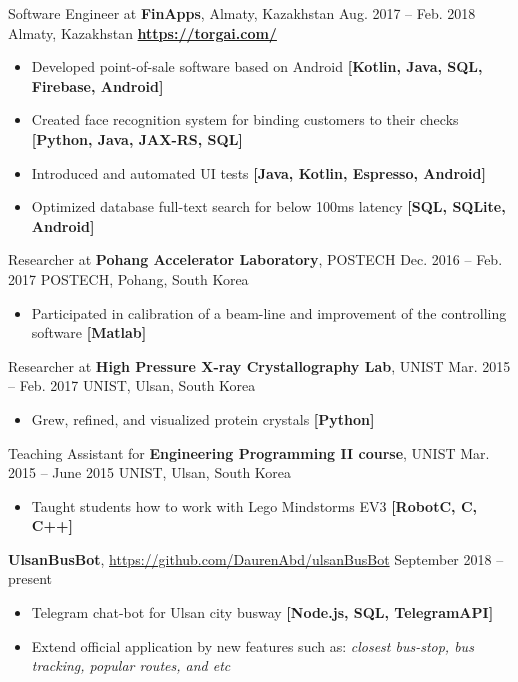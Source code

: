 \documentclass[10pt,a4paper]{altacv}
\begin{document}
\medskip

\cveventflat
    {Software Engineer at }
    {\textbf{FinApps}, Almaty, Kazakhstan}
    {Aug. 2017 -- Feb. 2018}
    {Almaty, Kazakhstan}
\smallskip
\newline
\href{https://torgai.com/}{\textbf{https://torgai.com/}}
\begin{itemize}
\item Developed point-of-sale software based on Android
    \textbf{[Kotlin, Java, SQL, Firebase, Android]}
\item Created face recognition system for binding customers to their checks 
    \textbf{[Python, Java, JAX-RS, SQL]}
\item Introduced and automated UI tests 
    \textbf{[Java, Kotlin, Espresso, Android]}
\item Optimized database full-text search for below 100ms latency 
    \textbf{[SQL, SQLite, Android]}
\end{itemize}

\medskip

\cveventflat
    {Researcher at}
    {\textbf{Pohang Accelerator Laboratory}, POSTECH}
    {Dec. 2016 -- Feb. 2017}
    {POSTECH, Pohang, South Korea}
\medskip
\begin{itemize}
\item Participated in calibration of a beam-line and improvement of the controlling software 
    \textbf{[Matlab]}
\end{itemize}
\medskip
\cveventflat
    {Researcher at}
    {\textbf{High Pressure X-ray Crystallography Lab}, UNIST}
    {Mar. 2015 --  Feb. 2017}
    {UNIST, Ulsan, South Korea}
\medskip
\begin{itemize}
\item Grew, refined, and visualized protein crystals
    \textbf{[Python]}
\end{itemize}

\medskip

\cveventflat
    {Teaching Assistant for }
    {\textbf{Engineering Programming II course}, UNIST}
    {Mar. 2015 -- June 2015}
    {UNIST, Ulsan, South Korea}
\medskip
\begin{itemize}
\item Taught students how to work with Lego Mindstorms EV3 
    \textbf{[RobotC, C, C++]}
\end{itemize}


\cveventflat
    {\textbf{UlsanBusBot}, }
    {{\url{https://github.com/DaurenAbd/ulsanBusBot}}}
    {September 2018 -- present}{}
\medskip
\begin{itemize}
\item Telegram chat-bot for Ulsan city busway
    \textbf{[Node.js, SQL, TelegramAPI]}
\item Extend official application by new features such as:
    \textit{closest bus-stop, bus tracking, popular routes, and etc}
\end{itemize}
\medskip
\end{document}
